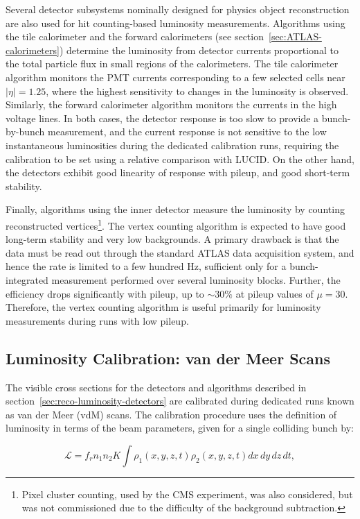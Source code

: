Several detector subsystems nominally designed for physics object reconstruction are also used for hit counting-based luminosity measurements. Algorithms using the tile calorimeter and the forward calorimeters (see section~\ref{sec:ATLAS-calorimeters}) determine the luminosity from detector currents proportional to the total particle flux in small regions of the calorimeters. The tile calorimeter algorithm monitors the PMT currents corresponding to a few selected cells near $|\eta|=1.25$, where the highest sensitivity to changes in the luminosity is observed. Similarly, the forward calorimeter algorithm monitors the currents in the high voltage lines. In both cases, the detector response is too slow to provide a bunch-by-bunch measurement, and the current response is not sensitive to the low instantaneous luminosities during the dedicated calibration runs, requiring the calibration to be set using a relative comparison with LUCID. On the other hand, the detectors exhibit good linearity of response with pileup, and good short-term stability. 

Finally, algorithms using the inner detector measure the luminosity by counting reconstructed vertices\footnote{Pixel cluster counting, used by the CMS experiment, was also considered, but was not commissioned due to the difficulty of the background subtraction.}. The vertex counting algorithm is expected to have good long-term stability and very low backgrounds. A primary drawback is that the data must be read out through the standard ATLAS data acquisition system, and hence the rate is limited to a few hundred Hz, sufficient only for a bunch-integrated measurement performed over several luminosity blocks. Further, the efficiency drops significantly with pileup, up to $\sim30\%$ at pileup values of $\mu=30$. Therefore, the vertex counting algorithm is useful primarily for luminosity measurements during runs with low pileup. 


\subsection{Luminosity Calibration: van der Meer Scans}\label{sec:reco-luminosity-calibration}
The visible cross sections for the detectors and algorithms described in section~\ref{sec:reco-luminosity-detectors} are calibrated during dedicated runs known as van der Meer (vdM) scans. The calibration procedure uses the definition of luminosity in terms of the beam parameters, given for a single colliding bunch by:

\begin{equation}\label{eqn:luminosity-geometrical}
	\mathcal{L} = f_r n_1 n_2 K \int \rho_1(x,y,z,t) \rho_2(x,y,z,t) dx\,dy\,dz\,dt,
\end{equation}

